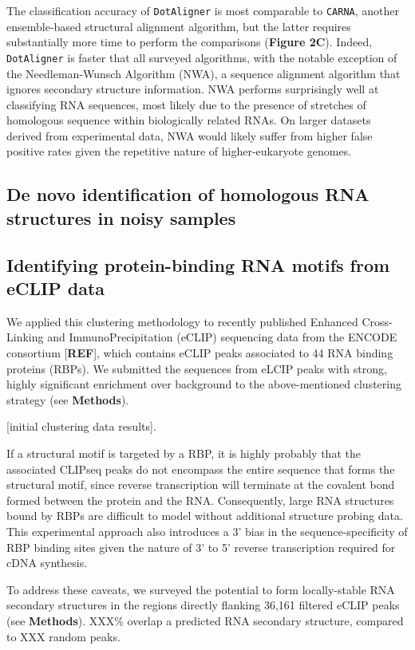 \documentclass[a4paper,11pt]{article}
\newcommand\dotaligner{\texttt{DotAligner}}
\newcommand\carna{\texttt{CARNA}}
\begin{document}
The classification accuracy  of \dotaligner{} is most comparable 
to \carna{}, another ensemble-based structural alignment algorithm, but the latter
requires substantially more time to perform the comparisons (\textbf{Figure 2C}). 
Indeed, \dotaligner{} is faster that all surveyed algorithms, with the notable 
exception of the Needleman-Wunsch Algorithm (NWA), a sequence alignment 
algorithm that ignores secondary structure information. NWA performs 
surprisingly well at classifying RNA sequences, most likely due to the presence
of stretches of homologous sequence within biologically related RNAs. On 
larger datasets derived from experimental data, NWA would likely suffer from 
higher false positive rates given the repetitive nature of higher-eukaryote genomes.

\subsection*{ De novo identification of homologous RNA structures in noisy samples }

\subsection*{ Identifying protein-binding RNA motifs from eCLIP data }
We applied this clustering methodology to recently published Enhanced Cross-Linking 
and ImmunoPrecipitation (eCLIP) sequencing data from the ENCODE consortium [\textbf{REF}], 
which contains eCLIP peaks associated to 44 RNA binding proteins (RBPs). We submitted the
sequences from eLCIP peaks with strong, highly significant enrichment over background 
to the above-mentioned clustering strategy (see \textbf{Methods}). 

[initial clustering data results]. 

If a structural motif is targeted by a RBP, it is highly probably that the associated CLIPseq peaks 
do not encompass the entire sequence that forms the structural motif, since 
reverse transcription will terminate at the covalent bond formed between the 
protein and the RNA. Consequently, large RNA structures bound by RBPs are 
difficult to model without additional structure probing data. This experimental 
approach also introduces a 3' bias in the sequence-specificity of RBP binding sites 
given the nature of 3' to 5' reverse transcription required for cDNA synthesis.

To address these caveats, we surveyed the potential to form locally-stable
RNA secondary structures in the regions directly flanking 36,161 filtered eCLIP 
peaks (see \textbf{Methods}). XXX\% overlap a predicted RNA secondary structure, 
compared to XXX random peaks. 
\end{document}
